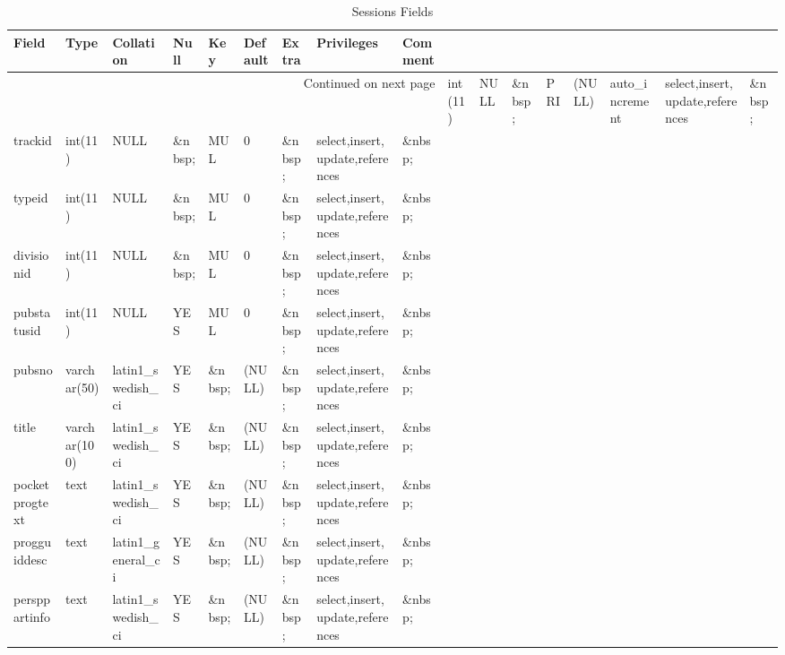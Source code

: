 \documentclass[tablesignature]{scrartcl}
\begin{document}
\begin{longtable}{|l|l|l|l|l|l|l|l|l|}
\caption{Sessions Fields} \label{tbl:sessionsfields}\\
\hline
 Field           &  Type          &  Collation                &  Null     &  Key      &  Default               &  Extra              &  Privileges                       &  Comment \\
\hline
\endhead
\hline\multicolumn{9}{r}{Continued on next page}\
\endfoot
\endlastfoot
\hline
 sessionid       &  int(11)       &  NULL                     &  \&nbsp;  &  PRI      &  (NULL)                &  auto\_{}increment  &  select,insert,update,references  &  \&nbsp;  \\
 trackid         &  int(11)       &  NULL                     &  \&nbsp;  &  MUL      &  0                     &  \&nbsp;            &  select,insert,update,references  &  \&nbsp;  \\
 typeid          &  int(11)       &  NULL                     &  \&nbsp;  &  MUL      &  0                     &  \&nbsp;            &  select,insert,update,references  &  \&nbsp;  \\
 divisionid      &  int(11)       &  NULL                     &  \&nbsp;  &  MUL      &  0                     &  \&nbsp;            &  select,insert,update,references  &  \&nbsp;  \\
 pubstatusid     &  int(11)       &  NULL                     &  YES      &  MUL      &  0                     &  \&nbsp;            &  select,insert,update,references  &  \&nbsp;  \\
 pubsno          &  varchar(50)   &  latin1\_{}swedish\_{}ci  &  YES      &  \&nbsp;  &  (NULL)                &  \&nbsp;            &  select,insert,update,references  &  \&nbsp;  \\
 title           &  varchar(100)  &  latin1\_{}swedish\_{}ci  &  YES      &  \&nbsp;  &  (NULL)                &  \&nbsp;            &  select,insert,update,references  &  \&nbsp;  \\
 pocketprogtext  &  text          &  latin1\_{}swedish\_{}ci  &  YES      &  \&nbsp;  &  (NULL)                &  \&nbsp;            &  select,insert,update,references  &  \&nbsp;  \\
 progguiddesc    &  text          &  latin1\_{}general\_{}ci  &  YES      &  \&nbsp;  &  (NULL)                &  \&nbsp;            &  select,insert,update,references  &  \&nbsp;  \\
 persppartinfo   &  text          &  latin1\_{}swedish\_{}ci  &  YES      &  \&nbsp;  &  (NULL)                &  \&nbsp;            &  select,insert,update,references  &  \&nbsp;  \\

\end{longtable}
\end{document}
